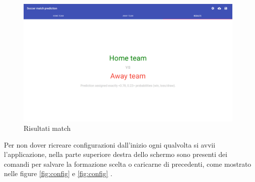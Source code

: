 \documentclass[hidelinks, 12pt]{article}
\begin{document}
\begin{figure}
	\centering
	\includegraphics[scale=0.3]{images/07_02_match_result.png}
	\caption[Risultati match]{Risultati match}
	\label{fig:match_result}
\end{figure}

\vspace{4ex}

Per non dover ricreare configurazioni dall'inizio ogni qualvolta si avvii l'applicazione, nella parte superiore destra dello schermo sono presenti dei comandi per salvare la formazione scelta o caricarne di precedenti, come mostrato nelle figure \ref{fig:config}  e \ref{fig:config} .
\end{document}
